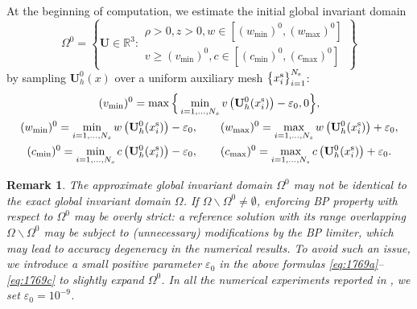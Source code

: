 \documentclass[times,final]{elsarticle}
\newtheorem{remark}{Remark}[section]
\numberwithin{equation}{section}
\theoremstyle{definition}
\theoremstyle{remark}
\newcommand{\BU}{\mathbf{U}}
\begin{document}
At the beginning of computation, we estimate the initial global invariant domain 
\[
{\Omega}^{0}
=
\left\{
\BU \in \mathbb{R}^3
:
\begin{array}{r}
	\rho > 0, z > 0,
	w \in \left[ (w_{\min})^{0}, (w_{\max})^{0} \right] \\
	v \ge (v_{\min})^{0},
	c \in \left[ (c_{\min})^{0}, (c_{\max})^{0}  \right]
\end{array}
\right\}
\]
by sampling $\BU_h^0(x)$ over a uniform auxiliary mesh $\big\{x^{\rm s}_i\big\}_{i = 1}^{N_{\rm s}}$:
\begin{gather}
	(v_{\min})^0 = \max \Big\{ \min_{i = 1,\dots,N_s} v\left(\BU_h^0 (x_i^{\rm s})\right) - \varepsilon_0, 0 \Big\}, \label{eq:1769a}
	\\
	(w_{\min})^0 = \min_{i = 1,\dots,N_s} w \left(\BU_h^0 (x_i^{\rm s})\right) - \varepsilon_0, 
	\qquad
	(w_{\max})^0 = \max_{i = 1,\dots,N_s} w \left(\BU_h^0 (x_i^{\rm s})\right) + \varepsilon_0, \label{eq:1769b}
	\\
	(c_{\min})^0 = \min_{i = 1,\dots,N_s} c \left(\BU_h^0 (x_i^{\rm s})\right) - \varepsilon_0, 
	\qquad
	(c_{\max})^0 = \max_{i = 1,\dots,N_s} c \left(\BU_h^0 (x_i^{\rm s})\right) + \varepsilon_0. \label{eq:1769c}
\end{gather}
\begin{remark}
	The approximate global invariant domain $\Omega^0$ may not be identical to the exact global invariant domain $\Omega$.
	If $\Omega \backslash \Omega^0 \neq \emptyset$, enforcing BP property with respect to $\Omega^0$ may be overly strict: a reference solution with its range overlapping $\Omega \backslash \Omega^0$ may be subject to (unnecessary) modifications by the BP limiter, which may lead to accuracy degeneracy in the numerical results.
	To avoid such an issue, we introduce a small positive parameter $\varepsilon_0$ in the above formulas \eqref{eq:1769a}--\eqref{eq:1769c} to slightly expand $\Omega^{0}$.
	In all the numerical experiments reported in , we set $\varepsilon_0 = 10^{-9}$.
\end{remark}
\end{document}
